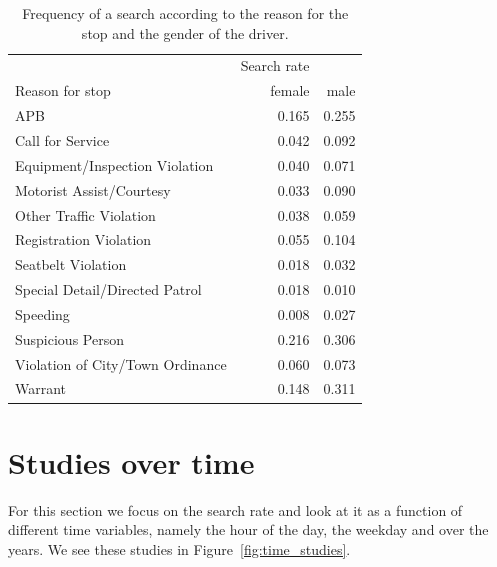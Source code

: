 \documentclass{article}
\begin{document}
\begin{table}[htbp]
\begin{center}
\begin{tabular}{lrr}
\toprule
{} &  Search rate & \\
Reason for stop                 &  female       &   male    \\
\midrule
APB                              &   0.165 & 0.255 \\
Call for Service                 &   0.042 & 0.092 \\
Equipment/Inspection Violation   &   0.040 & 0.071 \\
Motorist Assist/Courtesy         &   0.033 & 0.090 \\
Other Traffic Violation          &   0.038 & 0.059 \\
Registration Violation           &   0.055 & 0.104 \\
Seatbelt Violation               &   0.018 & 0.032 \\
Special Detail/Directed Patrol   &   0.018 & 0.010 \\
Speeding                         &   0.008 & 0.027 \\
Suspicious Person                &   0.216 & 0.306 \\
Violation of City/Town Ordinance &   0.060 & 0.073 \\
Warrant                          &   0.148 & 0.311 \\
\bottomrule
\end{tabular}
\caption{Frequency of a search according to the reason for the stop and the gender of the driver.}
\label{tab:search}
\end{center}
\end{table} 

\section{Studies over time}

For this section we focus on the search rate and look at it as a function of different time variables, namely the hour of the day, the weekday and over the years. We see these studies in Figure~\ref{fig:time_studies}.
\end{document}

